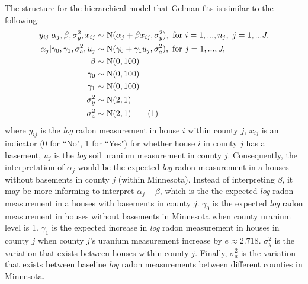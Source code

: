 \documentclass{article}
\newcommand\numberthis{\addtocounter{equation}{1}\tag{\theequation}}
\begin{document}
\noindent
The structure for the hierarchical model that Gelman fits is similar to the
following:
\begin{align*}
  y_{ij}|\alpha_j,\beta,\sigma_y^2,x_{ij} &\sim \text{N}(\alpha_j + \beta
      x_{ij},\sigma_y^2),\text{ for }i=1,...,n_j,~j=1,...J.\\
  \alpha_{j}|\gamma_0,\gamma_1,\sigma_a^2,u_j &\sim \text{N}(\gamma_0 +
      \gamma_1 u_j,\sigma_a^2),\text{ for }j=1,...,J,\\
  \beta &\sim \text{N}(0,100) \\
  \gamma_0 &\sim \text{N}(0,100)\\
  \gamma_1 &\sim \text{N}(0,100)\\
  \sigma_y^2 &\sim \text{N}(2,1)\\
  \sigma_a^2 &\sim \text{N}(2,1) \numberthis
\end{align*}
where $y_{ij}$ is the \textit{log} radon measurement in house $i$ within county
$j$, $x_{ij}$ is an indicator (0 for ``No", 1 for ``Yes") for whether house $i$
in county $j$ has a basement, $u_j$ is the \textit{log} soil uranium
measurement in county $j$. Consequently, the interpretation of $\alpha_j$ would
be the expected \textit{log} radon measurement in a houses without basements in
county $j$ (within Minnesota). Instead of interpreting $\beta$, it may be more
informing to interpret $\alpha_j+\beta$, which is the the expected \textit{log}
radon measurement in a houses with basements in county $j$. $\gamma_0$ is the
expected \textit{log} radon measurement in houses without basements in
Minnesota when county uranium level is 1. $\gamma_1$ is the expected increase
in \textit{log} radon measurement in houses in county $j$ when county $j$'s
uranium measurement increase by $e\approx 2.718$. $\sigma_y^2$ is the variation
that exists between houses within county $j$. Finally, $\sigma_a^2$ is the
variation that exists between baseline \textit{log} radon measurements between
different counties in Minnesota.\\
\end{document}
